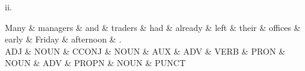ii. \\
\begin{center}
 {
 \footnotesize

 \begin{dependency}[] 
 \begin{deptext}
Many \& managers \& and \& traders \& had \& already \& left \& their \& offices \& early \& Friday \& afternoon \& . \\
ADJ \& NOUN \& CCONJ \& NOUN \& AUX \& ADV \& VERB \& PRON \& NOUN \& ADV \& PROPN \& NOUN \& PUNCT \\
\end{deptext}
\end{dependency}

 }
 \end{center}

